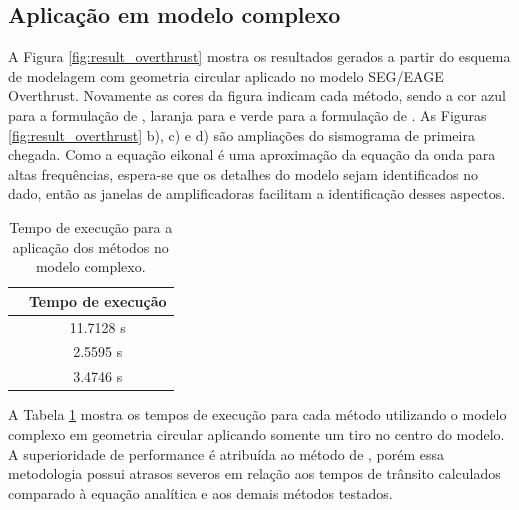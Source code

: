 \subsection*{Aplicação em modelo complexo}

A Figura \ref{fig:result_overthrust} mostra os resultados gerados a partir do esquema de modelagem com geometria circular aplicado no modelo SEG/EAGE Overthrust. Novamente as cores da figura indicam cada método, sendo a cor azul para a formulação de , laranja para  e verde para a formulação de . As Figuras \ref{fig:result_overthrust} b), c) e d) são ampliações do sismograma de primeira chegada. Como a equação eikonal é uma aproximação da equação da onda para altas frequências, espera-se que os detalhes do modelo sejam identificados no dado, então as janelas de amplificadoras facilitam a identificação desses aspectos.    

\begin{table}[H]
	\caption{Tempo de execução para a aplicação dos métodos no modelo complexo.}
	\begin{tabular}{r|c}
		& Tempo de execução \\ \hline
		\citeonline{podvin1991finite} & 11.7128 s  \\ \hline
		\citeonline{jeong2008fast} & 2.5595 s      \\ \hline
		\citeonline{noble2014accurate} & 3.4746 s         
	\end{tabular}
	\label{table_overthrust}
\end{table}

A Tabela \ref{table_overthrust} mostra os tempos de execução para cada método utilizando o modelo complexo em geometria circular aplicando somente um tiro no centro do modelo. A superioridade de performance é atribuída ao método de , porém essa metodologia possui atrasos severos em relação aos tempos de trânsito calculados comparado à equação analítica e aos demais métodos testados.

